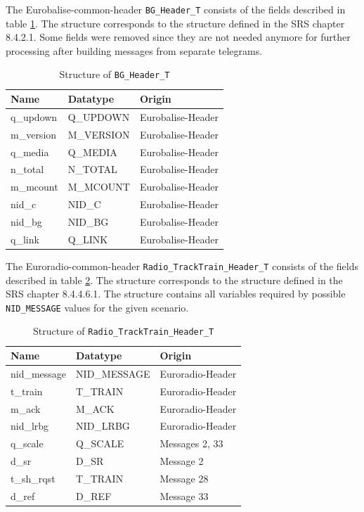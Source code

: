 \documentclass{template/openetcs_report}
\begin{document}
The Eurobalise-common-header \texttt{BG\_Header\_T} consists of the fields described in table \ref{tbl:BG_Header_T_structure}. The structure corresponds to the structure defined in the SRS chapter 8.4.2.1. Some fields were removed since they are not needed anymore for further processing after building messages from separate telegrams.

\begin{table}[H]
  \begin{tabular}{| l | l | l |}
  \hline
 \textbf{Name} & \textbf{Datatype} & \textbf{Origin}\\ \hline
 q\_updown & Q\_UPDOWN & Eurobalise-Header\\
 m\_version & M\_VERSION & Eurobalise-Header\\
 q\_media & Q\_MEDIA & Eurobalise-Header\\
 n\_total & N\_TOTAL & Eurobalise-Header\\
 m\_mcount & M\_MCOUNT & Eurobalise-Header\\ 
 nid\_c & NID\_C & Eurobalise-Header\\
 nid\_bg & NID\_BG & Eurobalise-Header\\
 q\_link & Q\_LINK & Eurobalise-Header\\ 
  \hline
  \end{tabular}
   \caption{Structure of \texttt{BG\_Header\_T}}
  \label{tbl:BG_Header_T_structure}
\end{table} 

The Euroradio-common-header \texttt{Radio\_TrackTrain\_Header\_T} consists of the fields described in table \ref{tbl:Radio_TrackTrain_Header_T_structure}. The structure corresponds to the structure defined in the SRS chapter 8.4.4.6.1. The structure contains all variables required by possible \texttt{NID\_MESSAGE} values for the given scenario.

\begin{table}[H]
  \begin{tabular}{| l | l | l |}
  \hline
  \textbf{Name} & \textbf{Datatype} & \textbf{Origin}\\ \hline
  nid\_message & NID\_MESSAGE & Euroradio-Header\\
  t\_train & T\_TRAIN & Euroradio-Header\\
  m\_ack & M\_ACK & Euroradio-Header\\
  nid\_lrbg & NID\_LRBG & Euroradio-Header\\
  q\_scale & Q\_SCALE & Messages 2, 33\\
  d\_sr & D\_SR & Message 2\\
  t\_sh\_rqst & T\_TRAIN & Message 28\\
  d\_ref & D\_REF & Message 33\\
  \hline
  \end{tabular}
   \caption{Structure of \texttt{Radio\_TrackTrain\_Header\_T}}
  \label{tbl:Radio_TrackTrain_Header_T_structure}
\end{table} 
\end{document}
